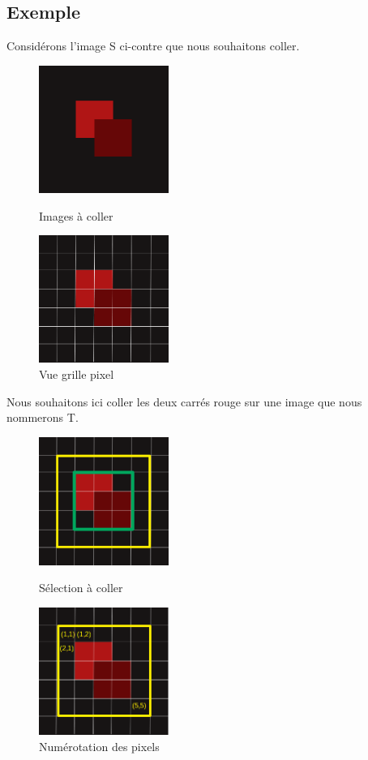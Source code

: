 \subsection{Exemple}
Considérons l'image S ci-contre que nous souhaitons coller. 
\begin{figure}[!htb]
   \begin{minipage}{0.5\textwidth}
     \centering
     \includegraphics[width = 120pt]{Images/square.png}
     \caption{Images à coller}
      \end{minipage}\hfill
   \begin{minipage}{0.5\textwidth}
     \centering
\includegraphics[width = 120pt]{Images/pix.png}
\caption{Vue grille pixel}
      \end{minipage}\hfill
\end{figure}
Nous souhaitons ici coller les deux carrés rouge sur une image que nous nommerons T.  

\begin{figure}[!htb]
   \begin{minipage}{0.5\textwidth}
     \centering
     \includegraphics[width = 120pt]{Images/carre_selection.png}
\caption{Sélection à coller}
      \end{minipage}\hfill
   \begin{minipage}{0.5\textwidth}
     \centering
\includegraphics[width = 120pt]{Images/numerote.png}
\caption{Numérotation des pixels}
      \end{minipage}\hfill
\end{figure} 
\newpage

